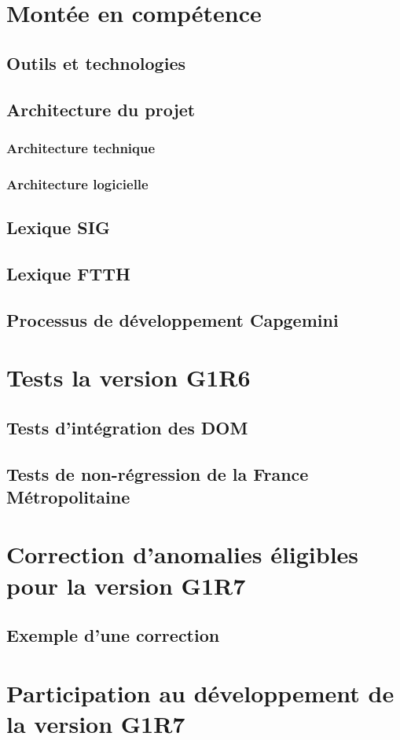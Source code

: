 \chapter{Montée en compétence}
\section{Outils et technologies}
\section{Architecture du projet}
\subsection{Architecture technique}
\subsection{Architecture logicielle}
\section{Lexique SIG}
\section{Lexique FTTH}
\section{Processus de développement Capgemini}
\chapter{Tests la version G1R6}
\section{Tests d'intégration des DOM}
\section{Tests de non-régression de la France Métropolitaine}
\chapter{Correction d'anomalies éligibles pour la version G1R7}
\section{Exemple d'une correction}
\chapter{Participation au développement de la version G1R7}
